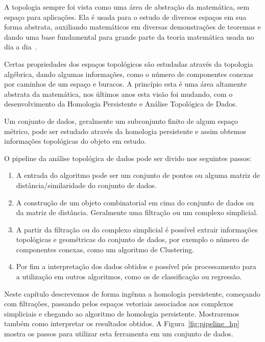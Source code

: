 A topologia sempre foi vista como uma área de abstração da matemática, sem
espaço para aplicações. Ela é usada para o estudo de diversos espaços
em sua forma abstrata, auxiliando matemáticos em diversas demonstrações
de teoremas e dando uma base fundamental para grande parte da teoria matemática
usada no dia a dia~\cite{Poincare1895}.

Certas propriedades dos espaços topológicos são estudadas através da
topologia algébrica, dando algumas informações, como o número de componentes
conexas por caminhos de um espaço e buracos. A princípio esta é uma área altamente
abstrata da matemática,  nos últimos anos esta visão foi mudando,
com o desenvolvimento da Homologia Persistente e Análise Topológica de Dados.

Um conjunto de dados, geralmente um subconjunto finito de algum espaço métrico,
pode ser estudado através da homologia persistente e assim obtemos informações
topológicas do objeto em estudo.

O pipeline da análise topológica de dados pode ser divido nos seguintes passos:
\begin{enumerate}
  \item A entrada do algoritmo pode ser um conjunto de pontos ou alguma matriz
  de distância/similaridade do conjunto de dados.
  \item A construção de um objeto combinatorial em cima do conjunto de dados ou
  da matriz de distância. Geralmente uma filtração ou um complexo simplicial.
  \item A partir da filtração ou do complexo simplicial é possível extrair informações
  topológicas e geométricas do conjunto de dados, por exemplo o número de
  componentes conexas, como um algoritmo de Clustering.
  \item Por fim a interpretação dos dados obtidos e possível pós processamento
  para a utilização em outros algoritmos, como os de classificação ou regressão.
\end{enumerate}

Neste capítulo descrevemos de forma ingênua a homologia persistente, começando com
filtrações, passando pelos espaços vetoriais associados
aos complexos simpliciais e chegando ao algoritmo de homologia persistente.
Mostraremos também como interpretar os resultados obtidos.
A Figura~\ref{fig:pipeline_hp} mostra os passos para utilizar esta ferramenta em um conjunto de dados.

